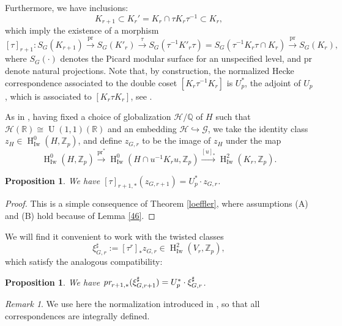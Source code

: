 \documentclass[12pt,a4paper,reqno]{amsart}
\theoremstyle{definition}
\numberwithin{definition}{subsection}
\theoremstyle{definition}
\numberwithin{Definition}{subsection}
\theoremstyle{remark}
\theoremstyle{remark}
\newtheorem{Remark}{Remark}
\numberwithin{Remark}{subsection}
\theoremstyle{remark}
\theoremstyle{plain}
\numberwithin{Theorem}{subsection}
\theoremstyle{plain}
\theoremstyle{plain}
\theoremstyle{plain}
\theoremstyle{plain}
\theoremstyle{plain}
\theoremstyle{plain}
\newtheorem{Proposition}[Theorem]{Proposition}
\theoremstyle{plain}
\newcommand*{\Z}{\mathbb{Z}}
\newcommand*{\Q}{\mathbb{Q}}
\newcommand*{\R}{\mathbb{R}}
\DeclareMathOperator{\U}{U}
\DeclareMathOperator{\h}{H}
\begin{document}
Furthermore, we have inclusions:
\[
K_{r+1}\subset K_r'=K_r\cap \tau K_r\tau^{-1}\subset K_r,
\]
which imply the existence of a morphism
\[
[\tau]_{r+1}: S_G(K_{r+1})\xrightarrow{\text{pr}} S_G(K'_r)\xrightarrow{\tau}S_G(\tau^{-1}K'_r\tau)=S_G(\tau^{-1}K_r\tau\cap K_r)\xrightarrow{\text{pr}}S_G(K_r),
\]
where $S_G(\cdot)$ denotes the Picard modular surface for an unspecified level, and $\text{pr}$ denote natural projections. Note that, by construction, the normalized Hecke correspondence associated to the double coset $[K_r\tau^{-1}K_r]$ is $U_p^*$, the adjoint of $U_p$, which is associated to $[K_r\tau K_r]$, see \cite[p. 4]{rockwood}.

As in \cite[p. 10]{loeffler}, having fixed a choice of globalization $\mathcal{H}/\Q$ of $H$ such that $\mathcal{H}(\R)\cong \U(1,1)(\R)$ and an embedding $\mathcal{H}\hookrightarrow \mathcal{G}$, we take the identity class $z_H\in \h^0_{\text{Iw}}(H,\Z_p)$, and define $z_{G,r}$ to be the image of $z_H$ under the map
\[
\h^0_{\text{Iw}}(H,\Z_p)\xrightarrow{\text{pr}^*}\h^0_{\text{Iw}}(H\cap u^{-1}K_ru,\Z_p)\xrightarrow{[u]_*} \h^2_{\text{Iw}}(K_r,\Z_p).
\]

\begin{Proposition}\emph{\cite[p. 10]{loeffler}}
We have $[\tau]_{r+1,*}(z_{G,r+1})=U_p^*\cdot z_{G,r}$.
\end{Proposition}
\begin{proof}
This is a simple consequence of Theorem \ref{loeffler}, where assumptions (A) and (B) hold because of Lemma \ref{46}.
\end{proof}

We will find it convenient to work with the twisted classes
\[
\xi_{G,r}^\sharp:=[\tau^r]_* z_{G,r}\in \h^2_{\text{Iw}}(V_r,\Z_p),
\]
which satisfy the analogous compatibility:
\begin{Proposition}\emph{\cite[p. 11]{loeffler}}
We have $\emph{pr}_{r+1,*}(\xi_{G,r+1}^\sharp)=U_p^*\cdot  \xi_{G,r}^\sharp$.
\end{Proposition}

\begin{Remark}
We use here the normalization introduced in \cite[p. 3]{rockwood}, so that all correspondences are integrally defined.
\end{Remark}
\end{document}
